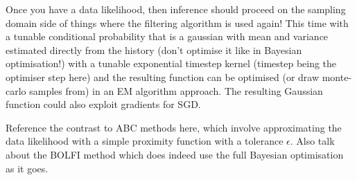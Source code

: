 Once you have a data likelihood, then inference should proceed on the sampling domain side of things where the filtering algorithm is used again! This time with a tunable conditional probability that is a gaussian with mean and variance estimated directly from the history (don't optimise it like in Bayesian optimisation!) with a tunable exponential timestep kernel (timestep being the optimiser step here) and the resulting function can be optimised (or draw monte-carlo samples from) in an EM algorithm approach. The resulting Gaussian function could also exploit gradients for SGD.

Reference the contrast to ABC methods here, which involve approximating the data likelihood with a simple proximity function with a tolerance $\epsilon$. Also talk about the BOLFI method which does indeed use the full Bayesian optimisation as it goes.

